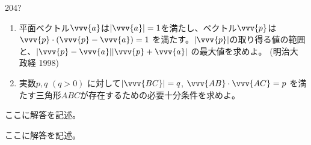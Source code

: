 \begin{thm}{204}{\hosi ?}{}
 \begin{enumerate}
  \item 平面ベクトル$\vvv{a}$は$|\vvv{a}|=1$を満たし、ベクトル$\vvv{p}$は$\vvv{p}\cdot(\vvv{p}-\vvv{a})=1$ を満たす。$|\vvv{p}|$の取り得る値の範囲と、$|\vvv{p}-\vvv{a}| |\vvv{p}+\vvv{a}|$ の最大値を求めよ。 (明治大 政経 1998)
  \item 実数$p, q$ $(q>0)$ に対して$|\vvv{BC}|=q$, $\vvv{AB}\cdot\vvv{AC}=p$ を満たす三角形$ABC$が存在するための必要十分条件を求めよ。
 \end{enumerate}
\end{thm}

ここに解答を記述。

ここに解答を記述。